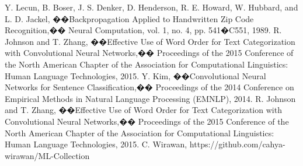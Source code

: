 \documentclass[12pt]{spieman}
\begin{document}
\begin{spacing}{1.5}
\newpage
\begin{thebibliography}{99}
Y. Lecun, B. Boser, J. S. Denker, D. Henderson, R. E. Howard, W. Hubbard, and L. D. Jackel, ��Backpropagation Applied to Handwritten Zip Code Recognition,�� Neural Computation, vol. 1, no. 4, pp. 541�C551, 1989.
R. Johnson and T. Zhang, ��Effective Use of Word Order for Text Categorization with Convolutional Neural Networks,�� Proceedings of the 2015 Conference of the North American Chapter of the Association for Computational Linguistics: Human Language Technologies, 2015.
Y. Kim, ��Convolutional Neural Networks for Sentence Classification,�� Proceedings of the 2014 Conference on Empirical Methods in Natural Language Processing (EMNLP), 2014.
R. Johnson and T. Zhang, ��Effective Use of Word Order for Text Categorization with Convolutional Neural Networks,�� Proceedings of the 2015 Conference of the North American Chapter of the Association for Computational Linguistics: Human Language Technologies, 2015.
C. Wirawan, https://github.com/cahya-wirawan/ML-Collection
\end{thebibliography}


\end{spacing}
\end{document}
